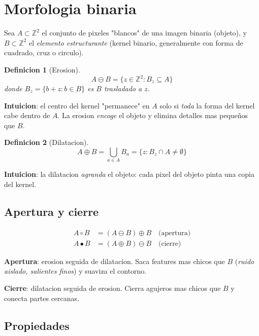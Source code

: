 \documentclass[11pt,a4paper,twoside,openright]{book}
\newtheorem{definicion}{Definicion}[chapter]
\begin{document}
\section{Morfologia binaria}

Sea $A \subset \mathbb{Z}^2$ el conjunto de pixeles "blancos" de una imagen binaria (objeto), y $B \subset \mathbb{Z}^2$ el \emph{elemento estructurante} (kernel binario, generalmente con forma de cuadrado, cruz o circulo).

\begin{definicion}[Erosion]
\begin{equation}
A \ominus B = \{ z \in \mathbb{Z}^2 : B_z \subseteq A \}
\end{equation}
donde $B_z = \{b + z : b \in B\}$ es $B$ trasladado a $z$.
\end{definicion}

\textbf{Intuicion}: el centro del kernel "permanece" en $A$ solo si \emph{toda} la forma del kernel cabe dentro de $A$. La erosion \emph{encoge} el objeto y elimina detalles mas pequeños que $B$.

\begin{definicion}[Dilatacion]
\begin{equation}
A \oplus B = \bigcup_{a \in A} B_a = \{ z : B_z \cap A \neq \emptyset \}
\end{equation}
\end{definicion}

\textbf{Intuicion}: la dilatacion \emph{agranda} el objeto: cada pixel del objeto pinta una copia del kernel.

\subsection{Apertura y cierre}

\begin{align}
A \circ B &= (A \ominus B) \oplus B \quad \text{(apertura)} \\
A \bullet B &= (A \oplus B) \ominus B \quad \text{(cierre)}
\end{align}

\textbf{Apertura}: erosion seguida de dilatacion. Saca features mas chicos que $B$ (\emph{ruido aislado, salientes finos}) y suaviza el contorno.

\textbf{Cierre}: dilatacion seguida de erosion. Cierra agujeros mas chicos que $B$ y conecta partes cercanas.

\subsection{Propiedades}
\end{document}
